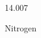 \documentclass[12pt]{article}
\begin{document}
\hfill{}
\vfill
\begin{center}
  {\fontsize{50}{60}
  }

  \vspace{1em}

  14.007

Nitrogen
\end{center}
\vfill
\end{document}
